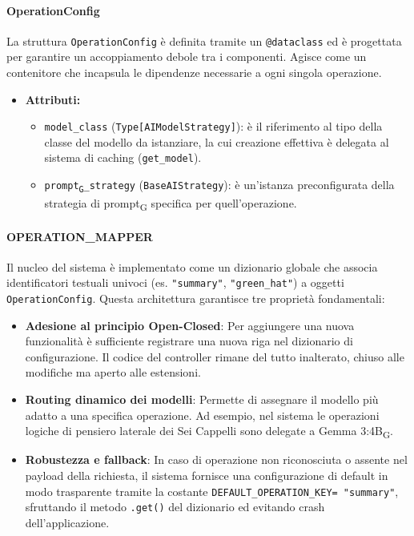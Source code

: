 \documentclass[11pt,a4paper]{article}
\newcommand{\gls}[1]{#1\textsubscript{G}}
\begin{document}
\paragraph{OperationConfig} 
La struttura \texttt{OperationConfig} è definita tramite un \texttt{@dataclass} ed è progettata per garantire un accoppiamento debole tra i componenti. Agisce come un contenitore che incapsula le dipendenze necessarie a ogni singola operazione.
\begin{itemize}
    \item\textbf{Attributi:}
    \begin{itemize}
        \item \texttt{model\_class} (\texttt{Type[AIModelStrategy]}): è il riferimento al tipo della classe del modello da istanziare, la cui creazione effettiva è delegata al sistema di caching (\texttt{get\_model}).
        \item \texttt{\gls{prompt}\_strategy} (\texttt{BaseAIStrategy}): è un'istanza preconfigurata della strategia di \gls{prompt} specifica per quell'operazione.
    \end{itemize}
\end{itemize}


\paragraph{OPERATION\_MAPPER}
Il nucleo del sistema è implementato come un dizionario globale che associa identificatori testuali univoci (es. \texttt{"summary"}, \texttt{"green\_hat"}) a oggetti \texttt{OperationConfig}. Questa architettura garantisce tre proprietà fondamentali:
\begin{itemize}
    \item \textbf{Adesione al principio Open-Closed}: Per aggiungere una nuova funzionalità è sufficiente registrare una nuova riga nel dizionario di configurazione. Il codice del controller rimane del tutto inalterato, chiuso alle modifiche ma aperto alle estensioni.
    \item \textbf{Routing dinamico dei modelli}: Permette di assegnare il modello più adatto a una specifica operazione. Ad esempio, nel sistema le operazioni logiche di pensiero laterale dei Sei Cappelli sono delegate a \gls{Gemma 3:4B}.
    \item \textbf{Robustezza e fallback}: In caso di operazione non riconosciuta o assente nel payload della richiesta, il sistema fornisce una configurazione di default in modo trasparente tramite la costante \texttt{DEFAULT\_OPERATION\_KEY= "summary"}, sfruttando il metodo \texttt{.get()} del dizionario ed evitando crash dell'applicazione.
\end{itemize}
\end{document}
